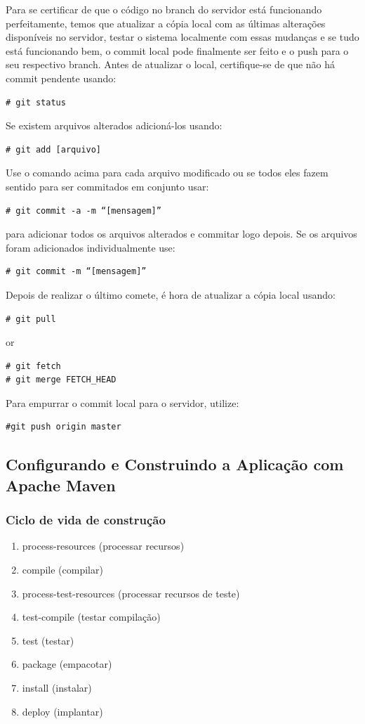 \documentclass[envcountsame,envcountchap,letterpaper]{svmono}
\begin{document}
Para se certificar de que o código no branch do servidor está funcionando perfeitamente, temos que atualizar a cópia local com as últimas alterações disponíveis no servidor, testar o sistema localmente com essas mudanças e se tudo está funcionando bem, o commit local pode finalmente ser feito e o push para o seu respectivo branch. Antes de atualizar o local, certifique-se de que não há commit pendente usando:
\begin{verbatim}
# git status
\end{verbatim}
Se existem arquivos alterados adicioná-los usando:
\begin{verbatim}
# git add [arquivo]
\end{verbatim}
Use o comando acima para cada arquivo modificado ou se todos eles fazem sentido para ser commitados em conjunto usar:
\begin{verbatim}
# git commit -a -m “[mensagem]”
\end{verbatim}
para adicionar todos os arquivos alterados e commitar logo depois. Se os arquivos foram adicionados individualmente use:
\begin{verbatim}
# git commit -m “[mensagem]”
\end{verbatim}
Depois de realizar o último comete, é hora de atualizar a cópia local usando:
\begin{verbatim}
# git pull
\end{verbatim}
or
\begin{verbatim}
# git fetch
# git merge FETCH_HEAD
\end{verbatim}

Para empurrar o commit local para o servidor, utilize:

\begin{verbatim}
#git push origin master
\end{verbatim}

\subsection{Configurando e Construindo a Aplicação com Apache Maven}
	
\subsubsection{Ciclo de vida de construção}

\begin{enumerate}
	\item process-resources (processar recursos)
 	\item compile (compilar)
	\item process-test-resources (processar recursos de teste)
	\item test-compile (testar compilação)
	\item test (testar)
	\item package (empacotar)
	\item install (instalar)
	\item deploy (implantar)
\end{enumerate}
	
\end{document}
